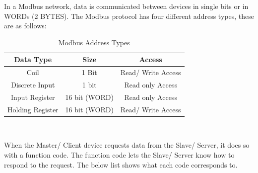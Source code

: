     In a Modbus network, data is communicated between devices in single bits or in WORDs (2 BYTES). 
    The Modbus protocol has four different address types, these are as follows:
    
        \begin{table}[H]
        \caption{Modbus Address Types}
        \begin{center}
            \begin{tabular}{ |c|c|c| }
                \hline
                \textbf{Data Type} & \textbf{Size} & \textbf{Access}\\ 
                \hline
                Coil                & 1 Bit         & Read/ Write Access\\
                Discrete Input      & 1 bit         & Read only Access\\
                Input Register      & 16 bit (WORD) & Read only Access\\
                Holding Register        & 16 bit (WORD) & Read/ Write Access\\
                \hline
            \end{tabular}\\
        \end{center}
        \label{table:modbusAddressTypes}
    \end{table}
    
    When the Master/ Client device requests data from the Slave/ Server, it does so with a function code. The function code lets the Slave/ Server know how to respond to the request. The below list shows what each code corresponds to. 


